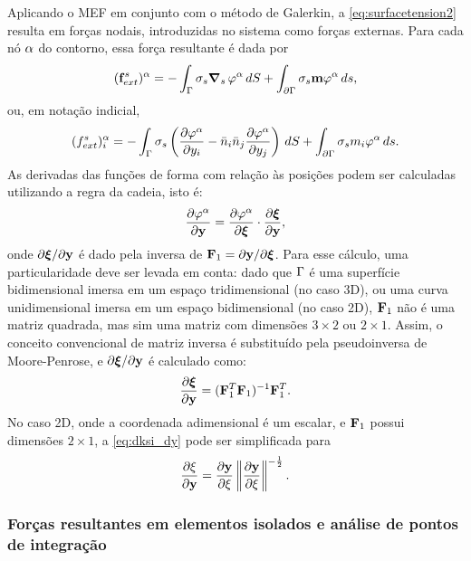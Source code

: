 \documentclass[Tese.tex]{subfiles}
\begin{document}
Aplicando o MEF em conjunto com o método de Galerkin, a \cref{eq:surfacetension2} resulta em forças nodais, introduzidas no sistema como forças externas. Para cada nó $\alpha$ do contorno, essa força resultante é dada por
\begin{equation}\label{eq:surfacetensionforce}
(\mathbf{f}_{ext}^s)^\alpha = -\int_{\Gamma}\sigma_s\boldsymbol{\nabla}_s\,\varphi^\alpha\,dS + \int_{\partial\Gamma}\sigma_s\mathbf{m} \varphi^\alpha\,ds,
\end{equation}
ou, em notação indicial,
\begin{equation}\label{eq:surfacetensionforce2}
({f}_{ext}^s)^\alpha_i = -\int_{\Gamma}\sigma_s\left(\dfrac{\partial\varphi^\alpha}{\partial y_i} - \bar{{n}}_i\bar{{n}}_j\dfrac{\partial\varphi^\alpha}{\partial y_j} \right)\,dS + \int_{\partial\Gamma}\sigma_sm_i \varphi^\alpha\,ds.
\end{equation}
As derivadas das funções de forma com relação às posições podem ser calculadas utilizando a regra da cadeia, isto é:
\begin{equation}
\dfrac{\partial\varphi^\alpha}{\partial\mathbf{y}} = \dfrac{\partial\varphi^\alpha}{\partial\boldsymbol{\xi}} \cdot \dfrac{\partial\boldsymbol{\xi}}{\partial\mathbf{y}},
\end{equation}
onde ${\partial\boldsymbol{\xi}}/{\partial\mathbf{y}}$ é dado pela inversa de $\mathbf{F}_1 = {\partial\mathbf{y}}/{\partial\boldsymbol{\xi}}$. Para esse cálculo, uma particularidade deve ser levada em conta: dado que $\Gamma$ é uma superfície bidimensional imersa em um espaço tridimensional (no caso 3D), ou uma curva unidimensional imersa em um espaço bidimensional (no caso 2D), $\mathbf{F}_1$ não é uma matriz quadrada, mas sim uma matriz com dimensões $3\times 2$ ou $2\times 1$. Assim, o conceito convencional de matriz inversa é substituído pela pseudoinversa de Moore-Penrose, e ${\partial\boldsymbol{\xi}}/{\partial\mathbf{y}}$ é calculado como:
\begin{equation}\label{eq:dksi_dy}
\dfrac{\partial\boldsymbol{\xi}}{\partial\mathbf{y}} = (\mathbf{F}_1^T\mathbf{F}_1)^{-1}\mathbf{F}_1^T.
\end{equation}
No caso 2D, onde a coordenada adimensional é um escalar, e $\mathbf{F}_1$ possui dimensões $2\times 1$, a \cref{eq:dksi_dy} pode ser simplificada para
\begin{equation}\label{eq:dksi_dy2D}
\dfrac{\partial{\xi}}{\partial\mathbf{y}} = \dfrac{\partial\mathbf{y}}{\partial{\xi}}\left\Vert\dfrac{\partial\mathbf{y}}{\partial{\xi}}\right\Vert^{-\frac{1}{2}}.
\end{equation}

\subsubsection{Forças resultantes em elementos isolados e análise de pontos de integração}\label{subsec:forcas-tensao-residual}
\end{document}
